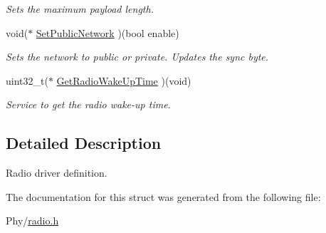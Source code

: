 \begin{DoxyCompactItemize}
\begin{DoxyCompactList}\small\item\em Sets the maximum payload length. \end{DoxyCompactList}\item 
void($\ast$ \hyperlink{group__LORA_ga33681fa99af4bf37517e1ba1107e1877}{Set\+Public\+Network} )(bool enable)
\begin{DoxyCompactList}\small\item\em Sets the network to public or private. Updates the sync byte. \end{DoxyCompactList}\item 
uint32\+\_\+t($\ast$ \hyperlink{group__LORA_ga7396df7c609fbda8b6ed87755b3899be}{Get\+Radio\+Wake\+Up\+Time} )(void)
\begin{DoxyCompactList}\small\item\em Service to get the radio wake-\/up time. \end{DoxyCompactList}\end{DoxyCompactItemize}


\subsection{Detailed Description}
Radio driver definition. 

The documentation for this struct was generated from the following file\+:\begin{DoxyCompactItemize}
\item 
Phy/\hyperlink{radio_8h}{radio.\+h}\end{DoxyCompactItemize}

